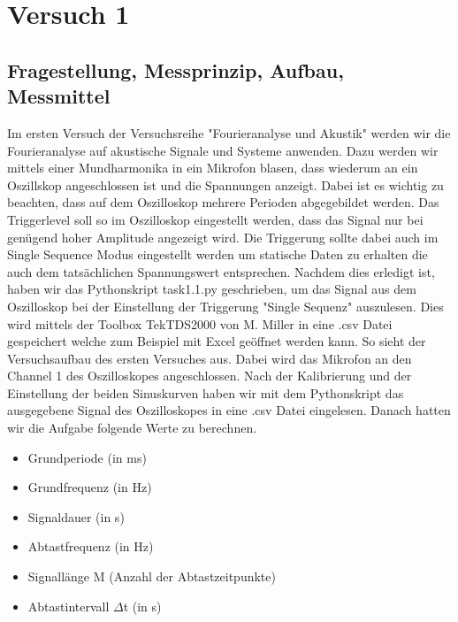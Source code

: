 \documentclass[12pt, oneside, a4paper, \docLanguage]{report}
\begin{document}
\chapter{Versuch 1}
\label{chap:VERSUCH_1}

\section{Fragestellung, Messprinzip, Aufbau, Messmittel}
\label{chap:VERSUCH_1_FRAGESTELLUNG}
Im ersten Versuch der Versuchsreihe "Fourieranalyse und Akustik" werden wir die Fourieranalyse auf akustische Signale und Systeme anwenden.
Dazu werden wir mittels einer Mundharmonika in ein Mikrofon blasen, dass wiederum an ein Oszillskop angeschlossen ist und die Spannungen anzeigt.
\newline 
Dabei ist es wichtig zu beachten, dass auf dem Oszilloskop mehrere Perioden abgegebildet werden. Das Triggerlevel soll so im Oszilloskop eingestellt werden, dass das Signal nur bei genügend hoher Amplitude angezeigt wird.
\newline 
Die Triggerung sollte dabei auch im Single Sequence Modus eingestellt werden um statische Daten zu erhalten die auch dem tatsächlichen Spannungswert entsprechen.
Nachdem dies erledigt ist, haben wir das Pythonskript task1.1.py geschrieben, um das Signal aus dem Oszilloskop bei der Einstellung der Triggerung "Single Sequenz" auszulesen.
\newline 
Dies wird mittels der Toolbox TekTDS2000 von M. Miller in eine .csv Datei gespeichert welche zum Beispiel mit Excel geöffnet werden kann.
\newpage
So sieht der Versuchsaufbau des ersten Versuches aus. Dabei wird das Mikrofon an den Channel 1 des Oszilloskopes angeschlossen. 
\newline 
Nach der Kalibrierung und der Einstellung der beiden Sinuskurven haben wir mit dem Pythonskript das ausgegebene Signal des Oszilloskopes in eine .csv Datei eingelesen.
\newline 
Danach hatten wir die Aufgabe folgende Werte zu berechnen.~\par
\begin{itemize}
	\item Grundperiode (in ms)
	\item Grundfrequenz (in Hz)
	\item Signaldauer (in s)
	\item Abtastfrequenz (in Hz)
	\item Signallänge M (Anzahl der Abtastzeitpunkte)
	\item Abtastintervall $\Delta$t (in s)
\end{itemize}
\end{document}
